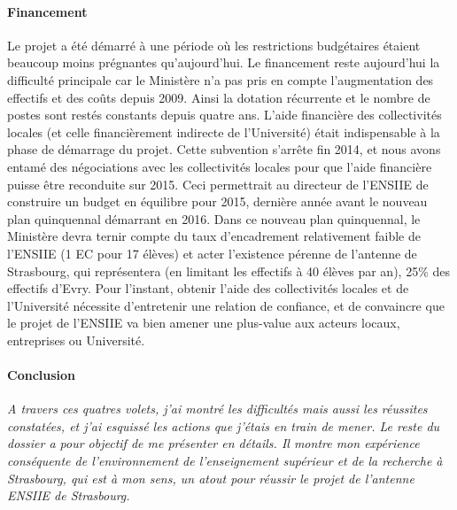 \documentclass[11pt]{article}
\begin{document}
\paragraph{Financement}
Le projet  a été démarré à  une période où les  restrictions budgétaires étaient
beaucoup moins  prégnantes qu'aujourd'hui.  Le financement  reste aujourd'hui la
difficulté principale car le Ministère n'a pas pris en compte l'augmentation des
effectifs et des coûts depuis 2009. Ainsi la dotation récurrente et le nombre de
postes  sont  restés  constants  depuis   quatre  ans.   L'aide  financière  des
collectivités locales (et celle  financièrement indirecte de l'Université) était
indispensable à la  phase de démarrage du projet. Cette  subvention s'arrête fin
2014, et nous avons entamé des  négociations avec les collectivités locales pour
que  l'aide financière  puisse être  reconduite sur  2015.  Ceci  permettrait au
directeur de l'ENSIIE  de construire un budget en équilibre  pour 2015, dernière
année avant le nouveau plan quinquennal  démarrant en 2016. Dans ce nouveau plan
quinquennal, le Ministère devra ternir compte du taux d'encadrement relativement
faible  de l'ENSIIE  (1  EC pour  17  élèves) et  acter  l'existence pérenne  de
l'antenne de Strasbourg, qui représentera (en limitant les effectifs à 40 élèves
par  an),  25\%  des  effectifs  d'Evry.  Pour  l'instant,  obtenir  l'aide  des
collectivités locales et de l'Université  nécessite d'entretenir une relation de
confiance,  et de  convaincre  que le  projet  de l'ENSIIE  va  bien amener  une
plus-value aux acteurs locaux, entreprises ou Université.\\



\bigskip
\paragraph{Conclusion}
\emph{A  travers ces  quatres  volets,  j'ai montré  les  difficultés  mais aussi  les
réussites  constatées, et  j'ai esquissé  les actions  que j'étais  en train  de
mener.  Le  reste du  dossier a  pour objectif  de me  présenter en  détails. Il
montre mon expérience conséquente de l'environnement de l'enseignement supérieur
et de la  recherche à Strasbourg, qui est  à mon sens, un atout  pour réussir le
projet de l'antenne ENSIIE de Strasbourg.}
  






\newpage
\end{document}
